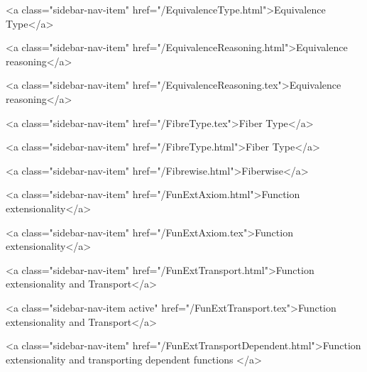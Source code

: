       
    
      
        
          <a class="sidebar-nav-item" href="/EquivalenceType.html">Equivalence Type</a>
        
      
    
      
        
          <a class="sidebar-nav-item" href="/EquivalenceReasoning.html">Equivalence reasoning</a>
        
      
    
      
        
          <a class="sidebar-nav-item" href="/EquivalenceReasoning.tex">Equivalence reasoning</a>
        
      
    
      
        
          <a class="sidebar-nav-item" href="/FibreType.tex">Fiber Type</a>
        
      
    
      
        
          <a class="sidebar-nav-item" href="/FibreType.html">Fiber Type</a>
        
      
    
      
        
          <a class="sidebar-nav-item" href="/Fibrewise.html">Fiberwise</a>
        
      
    
      
        
          <a class="sidebar-nav-item" href="/FunExtAxiom.html">Function extensionality</a>
        
      
    
      
        
          <a class="sidebar-nav-item" href="/FunExtAxiom.tex">Function extensionality</a>
        
      
    
      
        
          <a class="sidebar-nav-item" href="/FunExtTransport.html">Function extensionality and Transport</a>
        
      
    
      
        
          <a class="sidebar-nav-item active" href="/FunExtTransport.tex">Function extensionality and Transport</a>
        
      
    
      
        
          <a class="sidebar-nav-item" href="/FunExtTransportDependent.html">Function extensionality and transporting dependent functions </a>
        
